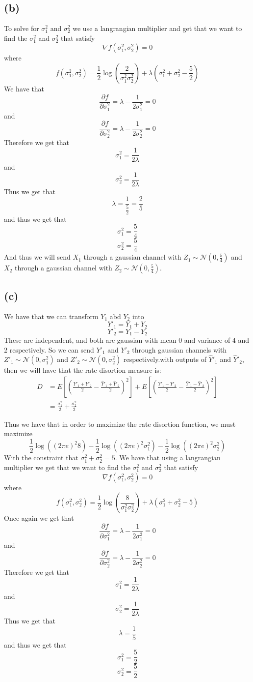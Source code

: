\subsection*{(b)}
To solve for $\sigma_1^2$ and $\sigma_2^2$ we use a langrangian multiplier and get that we want 
to find the $\sigma_1^2$ and $\sigma_2^2$ that satisfy
$$\nabla f(\sigma_1^2,\sigma_2^2)=0$$
where
$$f(\sigma_1^2,\sigma_2^2)=\frac{1}{2}\log\left(\frac{2}{\sigma_1^2\sigma_2^2}\right)+\lambda(\sigma_1^2+\sigma_2^2-\frac{5}{2})$$
We have that
$$\frac{\partial f}{\partial \sigma_1^2}=\lambda-\frac{1}{2\sigma_1^2}=0$$
and
$$\frac{\partial f}{\partial \sigma_2^2}=\lambda-\frac{1}{2\sigma_2^2}=0$$
Therefore we get that
$$\sigma_1^2=\frac{1}{2\lambda}$$
and
$$\sigma_2^2=\frac{1}{2\lambda}$$
Thus we get that
$$\lambda=\frac{1}{\frac{5}{2}}=\frac{2}{5}$$
and thus we get that
$$\sigma_1^2=\boxed{\frac{5}{4}}$$
$$\sigma_2^2=\boxed{\frac{5}{4}}$$
And thus we will send $X_1$ through a gaussian channel with 
$Z_1\sim \mathcal{N}(0,\frac{5}{4})$ and $X_2$ through a gaussian channel with
$Z_2\sim \mathcal{N}(0,\frac{5}{4})$.
\subsection*{(c)}
We have that we can transform $Y_1$ abd $Y_2$ into 
$$Y'_1=Y_1+Y_2$$
$$Y'_2=Y_1-Y_2$$
These are independent, and both are 
gaussian with mean 0 and variance of $4$ and $2$ respectively.
So we can send $Y'_1$ and $Y'_2$ through gaussian channels with 
$Z'_1\sim \mathcal{N}(0,\sigma_1^2)$ and $Z'_2\sim \mathcal{N}(0,\sigma_2^2)$ respectively.with 
outputs of $\hat{Y}'_1$ and $\hat{Y}'_2$, 
then we will have that the rate disortion measure is:
\begin{align*}
D&=E\left[\left(\frac{Y'_1+Y'_2}{2}-\frac{\hat{Y}'_1+\hat{Y}'_2}{2}\right)^2\right]
+E\left[\left(\frac{Y'_1-Y'_2}{2}-\frac{\hat{Y}'_1-\hat{Y}'_2}{2}\right)^2\right]\\
&=\frac{\sigma_1^2}{2}+\frac{\sigma_2^2}{2}
\end{align*}

Thus we have that
in order to maximize the rate disortion function, 
we must maximize 
$$\frac{1}{2}\log((2\pi e)^2 8)-\frac{1}{2}\log((2\pi e)^2 \sigma_1^2)-\frac{1}{2}\log((2\pi e)^2 \sigma_2^2)$$
With the constraint that $\sigma_1^2+\sigma_2^2=5$. We have that
using a langrangian multiplier we get that we want to find the $\sigma_1^2$ and $\sigma_2^2$ that satisfy
$$\nabla f(\sigma_1^2,\sigma_2^2)=0$$
where
$$f(\sigma_1^2,\sigma_2^2)=\frac{1}{2}\log\left(\frac{8}{\sigma_1^2\sigma_2^2}\right)+\lambda(\sigma_1^2+\sigma_2^2-5)$$
Once again we get that 
$$\frac{\partial f}{\partial \sigma_1^2}=\lambda-\frac{1}{2\sigma_1^2}=0$$
and
$$\frac{\partial f}{\partial \sigma_2^2}=\lambda-\frac{1}{2\sigma_2^2}=0$$
Therefore we get that
$$\sigma_1^2=\frac{1}{2\lambda}$$
and
$$\sigma_2^2=\frac{1}{2\lambda}$$
Thus we get that
$$\lambda=\frac{1}{5}$$
and thus we get that
$$\sigma_1^2=\boxed{\frac{5}{2}}$$
$$\sigma_2^2=\boxed{\frac{5}{2}}$$
